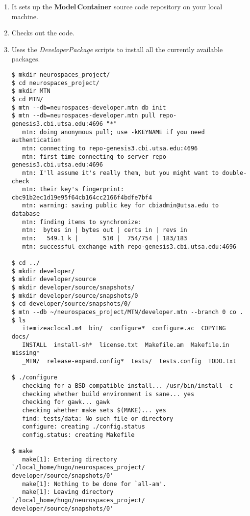 \documentclass[12pt]{article}
\begin{document}
\begin{enumerate}
\item It sets up the {\bf Model\,Container} source code repository on your local machine.
\item Checks out the code.
\item Uses the {\it DeveloperPackage} scripts to install all the currently available packages.
\begin{verbatim}
$ mkdir neurospaces_project/
$ cd neurospaces_project/
$ mkdir MTN
$ cd MTN/
$ mtn --db=neurospaces-developer.mtn db init
$ mtn --db=neurospaces-developer.mtn pull repo-genesis3.cbi.utsa.edu:4696 "*"
   mtn: doing anonymous pull; use -kKEYNAME if you need authentication
   mtn: connecting to repo-genesis3.cbi.utsa.edu:4696
   mtn: first time connecting to server repo-genesis3.cbi.utsa.edu:4696
   mtn: I'll assume it's really them, but you might want to double-check
   mtn: their key's fingerprint: cbc91b2ec1d19e95f64cb164cc2166f4bdfe7bf4
   mtn: warning: saving public key for cbiadmin@utsa.edu to database
   mtn: finding items to synchronize:
   mtn:  bytes in | bytes out | certs in | revs in
   mtn:   549.1 k |       510 |  754/754 | 183/183
   mtn: successful exchange with repo-genesis3.cbi.utsa.edu:4696

$ cd ../
$ mkdir developer/
$ mkdir developer/source
$ mkdir developer/source/snapshots/
$ mkdir developer/source/snapshots/0
$ cd developer/source/snapshots/0/
$ mtn --db ~/neurospaces_project/MTN/developer.mtn --branch 0 co .
$ ls
   itemizeaclocal.m4  bin/  configure*  configure.ac  COPYING  docs/ 
   INSTALL  install-sh*  license.txt  Makefile.am  Makefile.in  missing* 
   _MTN/  release-expand.config*  tests/  tests.config  TODO.txt

$ ./configure 
   checking for a BSD-compatible install... /usr/bin/install -c
   checking whether build environment is sane... yes
   checking for gawk... gawk
   checking whether make sets $(MAKE)... yes
   find: tests/data: No such file or directory
   configure: creating ./config.status
   config.status: creating Makefile

$ make
   make[1]: Entering directory `/local_home/hugo/neurospaces_project/ developer/source/snapshots/0'
   make[1]: Nothing to be done for `all-am'.
   make[1]: Leaving directory `/local_home/hugo/neurospaces_project/ developer/source/snapshots/0'


\end{verbatim}
\end{enumerate}
\end{document}
